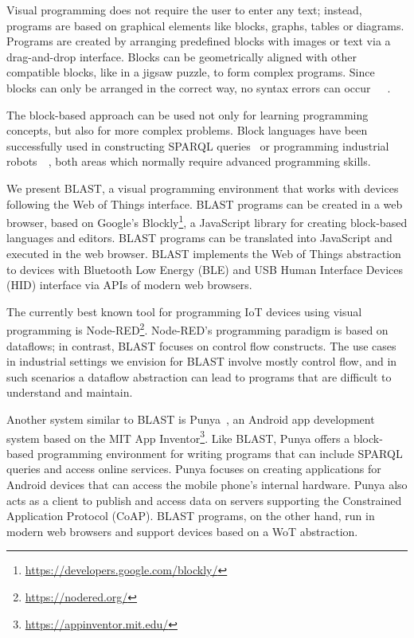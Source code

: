 \documentclass[runningheads]{llncs}
\begin{document}
Visual programming does not require the user to enter any text; instead, programs are based on graphical elements like blocks, graphs, tables or diagrams.
Programs are created by arranging predefined blocks with images or text via a drag-and-drop interface.
Blocks can be geometrically aligned with other compatible blocks, like in a jigsaw puzzle, to form complex programs.
Since blocks can only be arranged in the correct way, no syntax errors can occur~\cite{10.11453341221}~\cite{maloney2010scratch}~\cite{10.1145/1089733.1089734}.

The block-based approach can be used not only for learning programming concepts, but also for more complex problems.
Block languages have been successfully used in constructing SPARQL queries~\cite{7369012} or programming industrial robots~\cite{8120406}~\cite{tomlein2017visual}, both areas which normally require advanced programming skills.

We present BLAST, a visual programming environment that works with devices following the Web of Things interface.
BLAST programs can be created in a web browser, based on Google's Blockly\footnote{\url{https://developers.google.com/blockly/}}, a JavaScript library for creating block-based languages and editors.
BLAST programs can be translated into JavaScript and executed in the web browser.
BLAST implements the Web of Things abstraction to devices with Bluetooth Low Energy (BLE) and USB Human Interface Devices (HID) interface via APIs of modern web browsers.

The currently best known tool for programming IoT devices using visual programming is Node-RED\footnote{\url{https://nodered.org/}}.
Node-RED's programming paradigm is based on dataflows; in contrast, BLAST focuses on control flow constructs.
The use cases in industrial settings we envision for BLAST involve mostly control flow, and in such scenarios a dataflow abstraction can lead to programs that are difficult to understand and maintain.

Another system similar to BLAST is Punya~\cite{patton2021punya}, an Android app development system based on the MIT App Inventor\footnote{\url{https://appinventor.mit.edu/}}.
Like BLAST, Punya offers a block-based programming environment for writing programs that can include SPARQL queries and access online services.
Punya focuses on creating applications for Android devices that can access the mobile phone's internal hardware.
Punya also acts as a client to publish and access data on servers supporting the Constrained Application Protocol (CoAP).
BLAST programs, on the other hand, run in modern web browsers and support devices based on a WoT abstraction.
\end{document}
